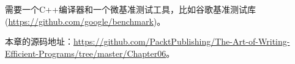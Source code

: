 需要一个C++编译器和一个微基准测试工具，比如谷歌基准测试库(\url{https://github.com/google/benchmark})。

本章的源码地址：\url{https://github.com/PacktPublishing/The-Art-of-Writing-Efficient-Programs/tree/master/Chapter06}。